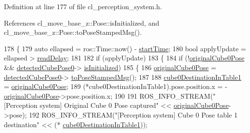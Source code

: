 Definition at line 177 of file cl\+\_\+perception\+\_\+system.\+h.



References cl\+\_\+move\+\_\+base\+\_\+z\+::\+Pose\+::is\+Initialized, and cl\+\_\+move\+\_\+base\+\_\+z\+::\+Pose\+::to\+Pose\+Stamped\+Msg().


\begin{DoxyCode}
178   \{
179     \textcolor{keyword}{auto} ellapsed = ros::Time::now() - \hyperlink{classsm__moveit__3_1_1cl__perception__system_1_1ClPerceptionSystem_adbc00ec0624260b9a927cf927fb1f549}{startTime};
180     \textcolor{keywordtype}{bool} applyUpdate = ellapsed > \hyperlink{classsm__moveit__3_1_1cl__perception__system_1_1ClPerceptionSystem_ad8826a690d57933b8adbe9011679f600}{readDelay};
181 
182     \textcolor{keywordflow}{if} (applyUpdate)
183     \{
184       \textcolor{keywordflow}{if} (!\hyperlink{classsm__moveit__3_1_1cl__perception__system_1_1ClPerceptionSystem_a296e8dd41bbb35a95d64e1780ab8be3d}{originalCube0Pose} && \hyperlink{classsm__moveit__3_1_1cl__perception__system_1_1ClPerceptionSystem_a6ac235df679beb12a5b5213bff957440}{detectedCubePose0}->
      \hyperlink{classcl__move__base__z_1_1Pose_a49df3a978021edb71a48ef5e6d8e75a8}{isInitialized})
185       \{
186         \hyperlink{classsm__moveit__3_1_1cl__perception__system_1_1ClPerceptionSystem_a296e8dd41bbb35a95d64e1780ab8be3d}{originalCube0Pose} = \hyperlink{classsm__moveit__3_1_1cl__perception__system_1_1ClPerceptionSystem_a6ac235df679beb12a5b5213bff957440}{detectedCubePose0}->
      \hyperlink{classcl__move__base__z_1_1Pose_a63887a88c1ac6e9a4a71b8d7d11aed6c}{toPoseStampedMsg}();
187 
188         \hyperlink{classsm__moveit__3_1_1cl__perception__system_1_1ClPerceptionSystem_a56f5be6a474c2825b99cab724d2099a1}{cube0DestinationInTable1} = \hyperlink{classsm__moveit__3_1_1cl__perception__system_1_1ClPerceptionSystem_a296e8dd41bbb35a95d64e1780ab8be3d}{originalCube0Pose};
189         (*cube0DestinationInTable1).pose.position.x = -\hyperlink{classsm__moveit__3_1_1cl__perception__system_1_1ClPerceptionSystem_a296e8dd41bbb35a95d64e1780ab8be3d}{originalCube0Pose}->pose.position.x;
190 
191         ROS\_INFO\_STREAM(\textcolor{stringliteral}{"[Perception system] Original Cube 0 Pose captured"} << 
      \hyperlink{classsm__moveit__3_1_1cl__perception__system_1_1ClPerceptionSystem_a296e8dd41bbb35a95d64e1780ab8be3d}{originalCube0Pose}->pose);
192         ROS\_INFO\_STREAM(\textcolor{stringliteral}{"[Perception system] Cube 0 Pose table 1 destination"} << (*
      \hyperlink{classsm__moveit__3_1_1cl__perception__system_1_1ClPerceptionSystem_a56f5be6a474c2825b99cab724d2099a1}{cube0DestinationInTable1}));

\end{DoxyCode}
